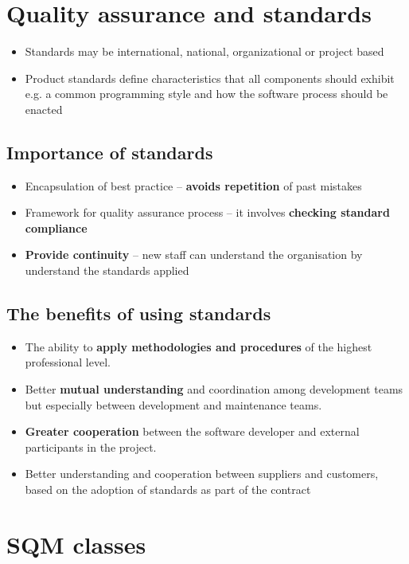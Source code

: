 \documentclass{article}
\begin{document}
\tableofcontents

\newpage

\section{Quality assurance and standards}
\begin{itemize}
  \item Standards may be international, national, organizational or project based
  \item Product standards define characteristics that all components should exhibit e.g. a common programming style and how the software process should be enacted
\end{itemize}

\subsection{Importance of standards}
\begin{itemize}
  \item Encapsulation of best practice – \textbf{avoids repetition} of past mistakes
  \item Framework for quality assurance process – it involves \textbf{checking standard compliance}
  \item \textbf{Provide continuity} – new staff can understand the organisation by understand the standards applied
\end{itemize}

\subsection{The benefits of using standards}
\begin{itemize}
  \item The ability to \textbf{apply methodologies and procedures} of the highest professional level.
  \item Better \textbf{mutual understanding} and coordination among development teams but especially between development and maintenance teams.
  \item \textbf{Greater cooperation} between the software developer and external participants in the project.
  \item Better understanding and cooperation between suppliers and customers, based on the adoption of standards as part of the contract
\end{itemize}

\section{SQM classes}
\end{document}
